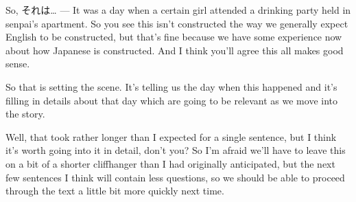 {}

So, それは\ldots{} --- It was a day when a certain girl attended a drinking party held in senpai's apartment. So you see this isn't constructed the way we generally expect English to be constructed, but that's fine because we have some experience now about how Japanese is constructed. And I think you'll agree this all makes good sense.

So that is setting the scene. It's telling us the day when this happened and it's filling in details about that day which are going to be relevant as we move into the story.

Well, that took rather longer than I expected for a single sentence, but I think it's worth going into it in detail, don't you? So I'm afraid we'll have to leave this on a bit of a shorter cliffhanger than I had originally anticipated, but the next few sentences I think will contain less questions, so we should be able to proceed through the text a little bit more quickly next time.

\stopsectionlevel
